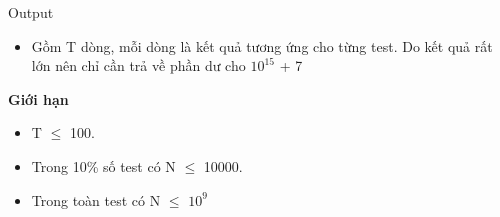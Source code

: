 Output
\begin{itemize}
	\item Gồm T dòng, mỗi dòng là kết quả tương ứng cho từng test. Do kết quả rất lớn nên chỉ cần trả về phần dư cho $10^{15}$ + 7
\end{itemize}

\textbf{Giới hạn }
\begin{itemize}
	\item T  $\le$  100.
	\item Trong 10\% số test có N  $\le$  10000.
	\item Trong toàn test có N  $\le$  $10^{9}$
\end{itemize}